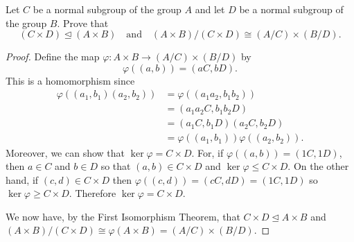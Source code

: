  Let $C$ be a normal subgroup of the group $A$ and let $D$
be a normal subgroup of the group $B$. Prove that
\begin{equation*}
  (C\times D)\trianglelefteq(A\times B)
  \quad\text{and}\quad
  (A\times B)/(C\times D)\cong(A/C)\times(B/D).
\end{equation*}
\begin{proof}
  Define the map $\varphi\colon A\times B\to(A/C)\times(B/D)$ by
  \begin{equation*}
    \varphi((a,b)) = (aC,bD).
  \end{equation*}
  This is a homomorphism since
  \begin{align*}
    \varphi((a_1,b_1)(a_2,b_2))
    &= \varphi((a_1a_2,b_1b_2)) \\
    &= (a_1a_2C, b_1b_2D) \\
    &= (a_1C,b_1D)(a_2C,b_2D) \\
    &= \varphi((a_1,b_1))\varphi((a_2,b_2)).
  \end{align*}
  Moreover, we can show that $\ker\varphi = C\times D$. For, if
  $\varphi((a,b)) = (1C,1D)$, then $a\in C$ and $b\in D$ so that
  $(a,b)\in C\times D$ and $\ker\varphi\leq C\times D$. On the other
  hand, if $(c,d)\in C\times D$ then
  $\varphi((c,d)) = (cC, dD) = (1C,1D)$ so
  $\ker\varphi\geq C\times D$. Therefore $\ker\varphi = C\times D$.

  We now have, by the First Isomorphism Theorem, that
  $C\times D\trianglelefteq A\times B$ and
  $(A\times B)/(C\times D)\cong \varphi(A\times B) =
  (A/C)\times(B/D)$.
\end{proof}

